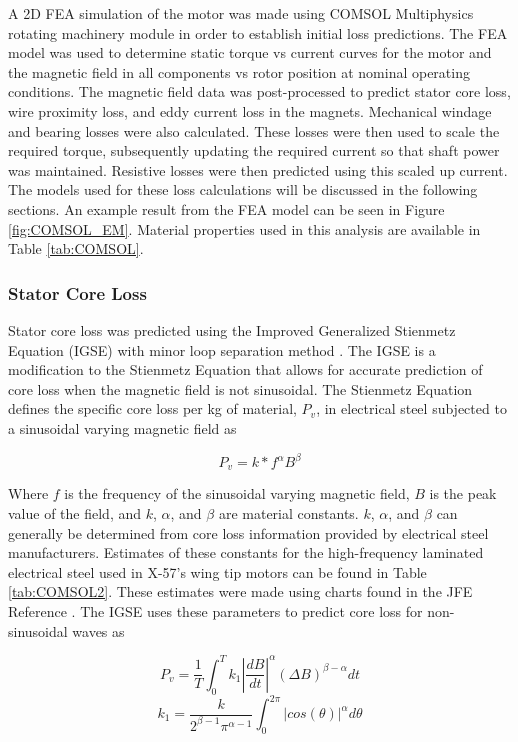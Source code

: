 \documentclass[]{aiaa-tc}%
\begin{document}
A 2D FEA simulation of the motor was made using COMSOL Multiphysics rotating machinery module in order to establish initial loss predictions. The FEA model was used to determine static torque vs current curves for the motor and the magnetic field in all components vs rotor position at nominal operating conditions. The magnetic field data was post-processed to predict stator core loss, wire proximity loss, and eddy current loss in the magnets. Mechanical windage and bearing losses were also calculated. These losses were then used to scale the required torque, subsequently updating the required current so that shaft power was maintained. Resistive losses were then predicted using this scaled up current. The models used for these loss calculations will be discussed in the following sections. An example result from the FEA model can be seen in Figure \ref{fig:COMSOL_EM}. Material properties used in this analysis are available in Table \ref{tab:COMSOL}.


\subsubsection{Stator Core Loss}
Stator core loss was predicted using the Improved Generalized Stienmetz Equation (IGSE) with minor loop separation method \cite{CoreLoss}. The IGSE is a modification to the Stienmetz Equation that allows for accurate prediction of core loss when the magnetic field is not sinusoidal. The Stienmetz Equation defines the specific core loss per kg of material, $P_{v}$, in electrical steel subjected to a sinusoidal varying magnetic field as

\begin{equation}
P_{v} = k*f^{\alpha}B^{\beta}
\label{eq:CoreLoss}
\end{equation}

Where $f$ is the frequency of the sinusoidal varying magnetic field, $B$ is the peak value of the field, 
and $k$, $\alpha$, and $\beta$ are material constants. $k$, $\alpha$, and $\beta$  
can generally be determined from core loss information provided by electrical steel manufacturers. 
Estimates of these constants for the high-frequency laminated electrical steel used in X-57's wing tip motors can be found in Table \ref{tab:COMSOL2}. 
These estimates were made using charts found in the JFE Reference \cite{JFE}. The IGSE uses these parameters to predict core loss for non-sinusoidal waves as


\begin{equation}
P_{v} = \frac{1}{T}\int_{0}^{T}k_{1}|\frac{dB}{dt}|^{\alpha}(\Delta B)^{\beta-\alpha}dt
\label{eq:CoreLoss2}
\end{equation}
\begin{equation}
k_{1} = \frac{k}{2^{\beta-1}\pi^{\alpha-1}}\int_{0}^{2\pi}|cos(\theta)|^{\alpha}d\theta
\label{eq:CoreLoss2b}
\end{equation}
\end{document}
